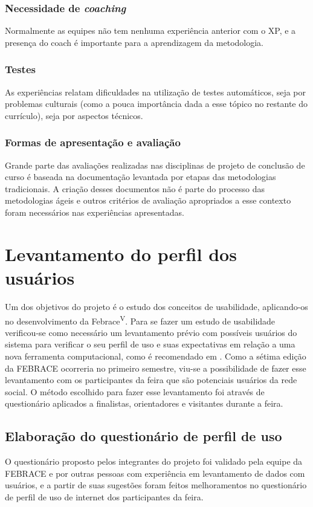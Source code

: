     \subsubsection{Necessidade de \textit{coaching}}
      Normalmente as equipes não tem nenhuma experiência anterior com o XP, e a presença do coach é importante para a aprendizagem da metodologia.

    \subsubsection{Testes}
      As experiências relatam dificuldades na utilização de testes automáticos, seja por problemas culturais (como a pouca importância dada a esse tópico no restante do currículo), seja por aspectos técnicos.

    \subsubsection{Formas de apresentação e avaliação}
      Grande parte das avaliações realizadas nas disciplinas de projeto de conclusão de curso é baseada na documentação levantada por etapas das metodologias tradicionais. A criação desses documentos não é parte do processo das metodologias ágeis e outros critérios de avaliação apropriados a esse contexto foram necessários nas experiências apresentadas.

\section{Levantamento do perfil dos usuários}
  Um dos objetivos do projeto é o estudo dos conceitos de usabilidade, aplicando-os no desenvolvimento da Febrace\textsuperscript{V}. Para se fazer um estudo de usabilidade verificou-se como necessário um levantamento prévio com possíveis usuários do sistema para verificar o seu perfil de uso e suas expectativas em relação a uma nova ferramenta computacional, como é recomendado em \cite{rosson01}. Como a sétima edição da FEBRACE ocorreria no primeiro semestre, viu-se a possibilidade de fazer esse levantamento com os participantes da feira que são potenciais usuários da rede social. O método escolhido para fazer esse levantamento foi através de questionário aplicados a finalistas, orientadores e visitantes durante a feira.

  \subsection{Elaboração do questionário de perfil de uso}
    O questionário proposto pelos integrantes do projeto foi validado pela equipe da FEBRACE e por outras pessoas com experiência em levantamento de dados com usuários, e a partir de suas sugestões foram feitos melhoramentos no questionário de perfil de uso de internet dos participantes da feira.

